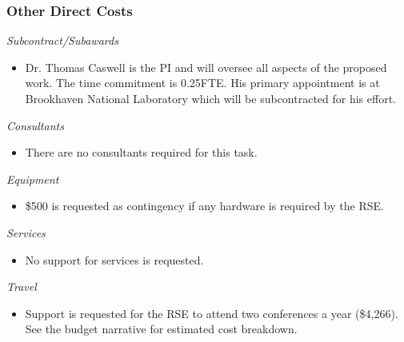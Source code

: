\documentclass[12pt]{article}
\numberwithin{page}{section}
\begin{document}
\subsubsection{Other Direct Costs}
\textit{Subcontract/Subawards}
\begin{itemize}
\item Dr. Thomas Caswell is the PI and will oversee all aspects of the
  proposed work.  The time commitment is 0.25FTE.  His primary
  appointment is at Brookhaven National Laboratory which will be
  subcontracted for his effort.
\end{itemize}
\textit{Consultants}
\begin{itemize}
\item There are no consultants required for this task.
\end{itemize}
\textit{Equipment}
\begin{itemize}
\item \$500 is requested as contingency if any hardware is required by the RSE.
\end{itemize}
\textit{Services}
\begin{itemize}
\item No support for services is requested.
\end{itemize}
\textit{Travel}
\begin{itemize}
\item Support is requested for the RSE to attend two conferences a
  year (\$4,266).  See the budget narrative for estimated cost
  breakdown.
\end{itemize}
\end{document}
